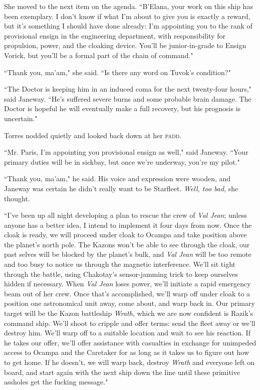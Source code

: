 \documentclass[twoside,letterpaper,12pt]{memoir}
\begin{document}
She moved to the next item on the agenda. ``B'Elana, your work on this ship has been exemplary. I don't know if what I'm about to give you is exactly a reward, but it's something I should have done already: I'm appointing you to the rank of provisional ensign in the engineering department, with responsibility for propulsion, power, and the cloaking device. You'll be junior-in-grade to Ensign Vorick, but you'll be a formal part of the chain of command." 

``Thank you, ma'am," she said. ``Is there any word on Tuvok's condition?" 

``The Doctor is keeping him in an induced coma for the next twenty-four hours," said Janeway. ``He's suffered severe burns and some probable brain damage. The Doctor is hopeful he will eventually make a full recovery, but his prognosis is uncertain." 

Torres nodded quietly and looked back down at her \textsc{padd}. 

``Mr. Paris, I'm appointing you provisional ensign as well," said Janeway. ``Your primary duties will be in sickbay, but once we're underway, you're my pilot." 

``Thank you, ma'am," he said. His voice and expression were wooden, and Janeway was certain he didn't really want to be Starfleet. \textit{Well, too bad}, she thought. 

``I've been up all night developing a plan to rescue the crew of \textit{Val Jean}; unless anyone has a better idea, I intend to implement it four days from now. Once the cloak is ready, we will proceed under cloak to Ocampa and take position above the planet's north pole. The Kazons won't be able to see through the cloak, our past selves will be blocked by the planet's bulk, and \textit{Val Jean} will be too remote and too busy to notice us through the magnetic interference. We'll sit tight through the battle, using Chakotay's sensor-jamming trick to keep ourselves hidden if necessary. When \textit{Val Jean} loses power, we'll initiate a rapid emergency beam out of her crew. Once that's accomplished, we'll warp off under cloak to a position one astronomical unit away, come about, and warp back in. Our primary target will be the Kazon battleship \textit{Wrath}, which we are now confident is Razik's command ship. We'll shoot to cripple and offer terms: send the fleet away or we'll destroy him. We'll warp off to a suitable location and wait to see his reaction. If he takes our offer, we'll offer assistance with casualties in exchange for unimpeded access to Ocampa and the Caretaker for as long as it takes us to figure out how to get home. If he doesn't, we will warp back, destroy \textit{Wrath} and everyone left on board, and start again with the next ship down the line until these primitive assholes get the fucking message." 
\end{document}
